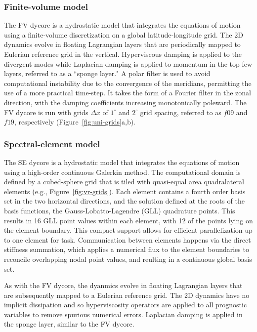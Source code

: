 \documentclass[draft]{agujournal2019}
\begin{document}
\subsubsection{Finite-volume model}

The FV dycore is a hydrostatic model that integrates the equations of motion using a finite-volume discretization on a global latitude-longitude grid. The 2D dynamics evolve in floating Lagrangian layers that are periodically mapped to Eulerian reference grid in the vertical. Hyperviscous damping is applied to the divergent modes while Laplacian damping is applied to momentum in the top few layers, referred to as a ``sponge layer." A polar filter is used to avoid computational instability due to the convergence of the meridians, permitting the use of a more practical time-step. It takes the form of a Fourier filter in the zonal direction, with the damping coefficients increasing monotonically poleward.  The FV dycore is run with grids $\Delta x$ of $1^{\circ}$ and $2^{\circ}$ grid spacing, referred to as $f09$ and $f19$, respectively (Figure~\ref{fig:uni-grids}a,b).

\subsubsection{Spectral-element model}

The SE dycore is a hydrostatic model that integrates the equations of motion using a high-order continuous Galerkin method. The computational domain is defined by a cubed-sphere grid that is tiled with quasi-equal area quadralateral elements (e.g., Figure~\ref{fig:vr-grids}). Each element contains a fourth order basis set in the two horizontal directions, and the solution defined at the roots of the basis functions, the Gauss-Lobatto-Lagendre (GLL) quadrature points. This results in 16 GLL point values within each element, with 12 of the points lying on the element boundary. This compact support allows for efficient parallelization up to one element for task. Communication between elements happens via the direct stiffness summation, which applies a numerical flux to the element boundaries to reconcile overlapping nodal point values, and reulting in a continuous global basis set. 

As with the FV dycore, the dyanmics evolve in floating Lagrangian layers that are subsequently mapped to a Eulerian reference grid. The 2D dynamics have no implicit dissipation and so hyperviscosity operators are applied to all prognostic variables to remove spurious numerical errors. Laplacian damping is applied in the sponge layer, similar to the FV dycore.
\end{document}
